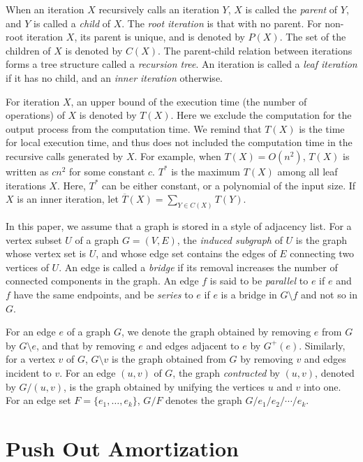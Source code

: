 \documentclass{llncs}
\begin{document}
When an iteration $X$ recursively calls an iteration $Y$, $X$ is called 
the {\em parent} of $Y$, and $Y$ is called a {\em child} of $X$.
The {\em root iteration} is that with no parent.
For non-root iteration $X$, its parent is unique, and is denoted by $P(X)$.
The set of the children of $X$ is denoted by $C(X)$.
The parent-child relation between iterations forms a tree structure
 called a {\em recursion tree}.
An iteration is called a {\em leaf iteration} if it has no child, and 
 an {\em inner iteration} otherwise.

For iteration $X$, an upper bound of the
 execution time (the number of operations) of $X$ is denoted by $T(X)$.
Here we exclude the computation for the output process from the
 computation time.
We remind that $T(X)$ is the time for local execution time, and thus does
 not included the computation time in the recursive calls generated by $X$.
For example, when $T(X) = O(n^2)$, $T(X)$ is written as $cn^2$ for some 
 constant $c$.
$T^*$ is the maximum $T(X)$ among all leaf iterations $X$.
Here, $T^*$ can be either constant, or a polynomial of the input size.
If $X$ is an inner iteration, let $\overline{T}(X) = \sum_{Y \in C(X)} T(Y)$.

In this paper, we assume that a graph is stored in a style of adjacency list.
For a vertex subset $U$ of a graph $G=(V,E)$, the {\em induced
 subgraph} of $U$ is the graph whose vertex set is $U$, and whose edge
 set contains the edges of $E$ connecting two vertices of $U$.
An edge is called a {\em bridge} if its removal increases the number
 of connected components in the graph.
An edge $f$ is said to be {\em parallel} to $e$ if $e$ and $f$ have the same
 endpoints, and be {\em series} to $e$
  if $e$ is a bridge in $G\setminus f$ and not so in $G$.

For an edge $e$ of a graph $G$, we denote the graph obtained by removing
 $e$ from $G$ by $G\setminus e$, and that by removing $e$ and edges adjacent
 to $e$ by $G^+(e)$.
Similarly, for a vertex $v$ of $G$, $G\setminus v$ is the graph obtained 
 from $G$ by removing $v$ and edges incident to $v$.
For an edge $(u,v)$ of $G$, the graph {\em contracted} by $(u,v)$, denoted 
 by $G/(u,v)$, is the graph obtained by unifying
  the vertices $u$ and $v$ into one.
For an edge set $F=\{e_1,\ldots,e_k\}$, $G/F$ denotes the graph 
 $G/e_1/e_2/\cdots/e_k$.

\vspace{-2mm}
\section{Push Out Amortization}\label{sec:PO}
\vspace{-2mm}
\end{document}
